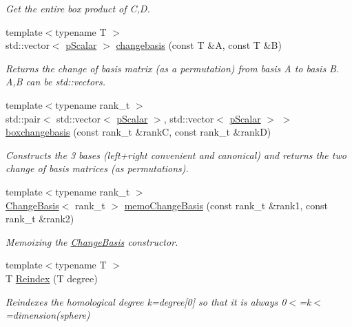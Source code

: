 \begin{DoxyCompactItemize}
\begin{DoxyCompactList}\small\item\em Get the entire box product of C,D. \end{DoxyCompactList}\item 
{\footnotesize template$<$typename T $>$ }\\std\+::vector$<$ \hyperlink{namespaceMackey_a67b5f4650ba2f166d15133a1bea2472b}{p\+Scalar} $>$ \hyperlink{namespaceMackey_a92891f5582872405be46b80b5fa1fb84}{changebasis} (const T \&A, const T \&B)
\begin{DoxyCompactList}\small\item\em Returns the change of basis matrix (as a permutation) from basis A to basis B. A,B can be std\+::vector\textquotesingle{}s. \end{DoxyCompactList}\item 
{\footnotesize template$<$typename rank\+\_\+t $>$ }\\std\+::pair$<$ std\+::vector$<$ \hyperlink{namespaceMackey_a67b5f4650ba2f166d15133a1bea2472b}{p\+Scalar} $>$, std\+::vector$<$ \hyperlink{namespaceMackey_a67b5f4650ba2f166d15133a1bea2472b}{p\+Scalar} $>$ $>$ \hyperlink{namespaceMackey_a90ea60504ffb74da3a53875368225f8f}{boxchangebasis} (const rank\+\_\+t \&rankC, const rank\+\_\+t \&rankD)
\begin{DoxyCompactList}\small\item\em Constructs the 3 bases (left+right convenient and canonical) and returns the two change of basis matrices (as permutations). \end{DoxyCompactList}\item 
{\footnotesize template$<$typename rank\+\_\+t $>$ }\\\hyperlink{classMackey_1_1ChangeBasis}{Change\+Basis}$<$ rank\+\_\+t $>$ \hyperlink{namespaceMackey_a70952d513d08b47bc282441a3e9d732c}{memo\+Change\+Basis} (const rank\+\_\+t \&rank1, const rank\+\_\+t \&rank2)
\begin{DoxyCompactList}\small\item\em Memoizing the \hyperlink{classMackey_1_1ChangeBasis}{Change\+Basis} constructor. \end{DoxyCompactList}\item 
{\footnotesize template$<$typename T $>$ }\\T \hyperlink{namespaceMackey_a7da73ade3ee83c4ffd614e79242d7c04}{Reindex} (T degree)
\begin{DoxyCompactList}\small\item\em Reindexes the homological degree k=degree\mbox{[}0\mbox{]} so that it is always 0$<$=k$<$=dimension(sphere) \end{DoxyCompactList}\item 

\end{DoxyCompactItemize}
